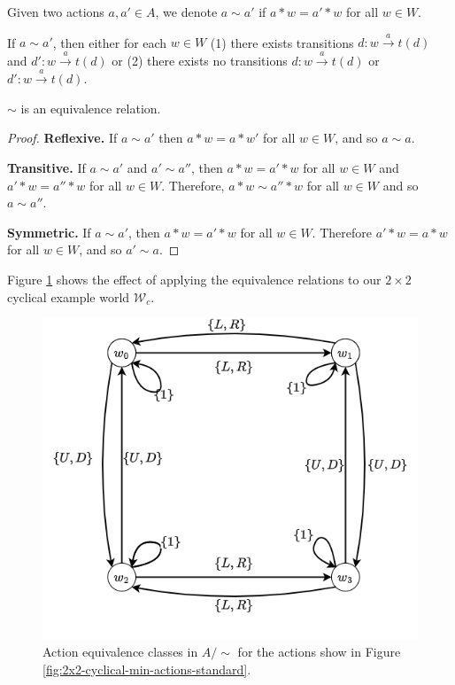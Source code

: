 \begin{definition}
    Given two actions $a, a' \in A$, we denote $a \sim a'$ if $a * w = a' * w$ for all $w \in W$.
\end{definition}

\begin{remark}
    If $a \sim a'$, then either for each $w \in W$ (1) there exists transitions $d: w \xrightarrow{a} t(d)$ and $d': w \xrightarrow{a} t(d)$ or (2) there exists no transitions $d: w \xrightarrow{a} t(d)$ or $d': w \xrightarrow{a} t(d)$.
\end{remark}

\begin{proposition}
    $\sim$ is an equivalence relation.
\end{proposition}
\begin{proof}
    \textbf{Reflexive.}
    If $a \sim a'$ then $a * w = a * w'$ for all $w \in W$, and so $a \sim a$.

    \textbf{Transitive.}
    If $a \sim a'$ and $a' \sim a''$, then $a * w = a' * w$ for all $w \in W$ and $a' * w = a'' * w$ for all $w \in W$.
    Therefore, $a * w \sim a'' * w$ for all $w \in W$ and so $a \sim a''$.

    \textbf{Symmetric.}
    If $a \sim a'$, then $a * w = a' * w$ for all $w \in W$.
    Therefore $a' * w = a * w$ for all $w \in W$, and so $a' \sim a$.
\end{proof}

Figure \ref{fig:2x2-cyclical-min-act-equivalence} shows the effect of applying the equivalence relations to our $2 \times 2$ cyclical example world $\mathscr{W}_{c}$.

\begin{figure}
    \centering
    \includegraphics[width=0.5\linewidth]{2MathematicalFramework/ReproducingSBDR/Images/2x2-cyclical-min-actions-equivalence.png}
    \caption{Action equivalence classes in $A/\sim$ for the actions show in Figure \ref{fig:2x2-cyclical-min-actions-standard}.}
    \label{fig:2x2-cyclical-min-act-equivalence}
\end{figure}

